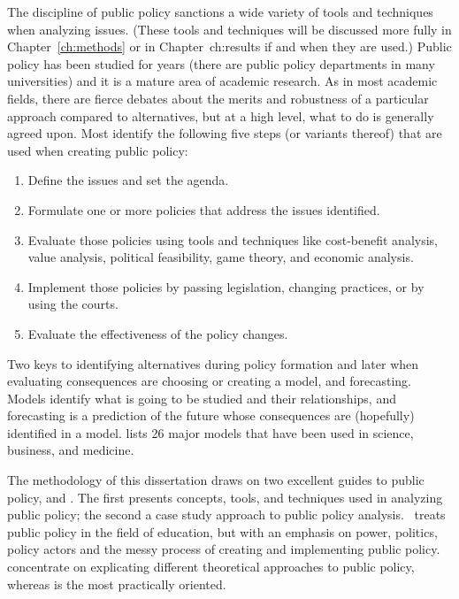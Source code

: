 The discipline of public policy sanctions a wide variety of tools and techniques when analyzing issues. (These tools and techniques will be discussed more fully in Chapter~\ref{ch:methods} or in Chapter~{ch:results} if and when they are used.) Public policy has been studied for years (there are public policy departments in many universities) and it is a mature area of academic research. As in most academic fields, there are fierce debates about the merits and robustness of a particular approach compared to alternatives, but at a high level, what to do is generally agreed upon. Most identify the following five steps (or variants thereof) that are used when creating public policy:

\begin{enumerate}
    \item Define the issues and set the agenda.
    \item Formulate one or more policies that address the issues identified.
    \item Evaluate those policies using tools and techniques like cost-benefit analysis, value analysis, political feasibility, game theory, and economic analysis.
    \item Implement those policies by passing legislation, changing practices, or by using the courts.
    \item Evaluate the effectiveness of the policy changes.
  \end{enumerate}
  
Two keys to identifying alternatives during policy formation and later when evaluating consequences are choosing or creating a model, and forecasting. Models identify what is going to be studied and their relationships, and forecasting is a prediction of the future whose consequences are (hopefully) identified in a model. \textcite{Page2018} lists 26 major models that have been used in science, business, and medicine. %

The methodology of this dissertation draws on two excellent guides to public policy, \textcite{Clemons.McBeth2021} and \textcite{Gupta2011}. The first presents concepts, tools, and techniques used in analyzing public policy; the second a case study approach to public policy analysis. \textcite{Fowler2013} treats public policy in the field of education, but with an emphasis on power, politics, policy actors and the messy process of creating and implementing public policy.  \citeauthor{Clemons.McBeth2021} concentrate on explicating different theoretical approaches to public policy, whereas \citeauthor{Gupta2011} is the most practically oriented.

